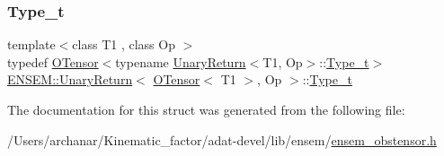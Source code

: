 \subsubsection{\texorpdfstring{Type\_t}{Type\_t}\hspace{0.1cm}{\footnotesize\ttfamily [3/3]}}
{\footnotesize\ttfamily template$<$class T1 , class Op $>$ \\
typedef \mbox{\hyperlink{classENSEM_1_1OTensor}{O\+Tensor}}$<$typename \mbox{\hyperlink{structENSEM_1_1UnaryReturn}{Unary\+Return}}$<$T1, Op$>$\+::\mbox{\hyperlink{structENSEM_1_1UnaryReturn_3_01OTensor_3_01T1_01_4_00_01Op_01_4_a2896ac85d983d41194d2482e3b851bb0}{Type\+\_\+t}}$>$ \mbox{\hyperlink{structENSEM_1_1UnaryReturn}{E\+N\+S\+E\+M\+::\+Unary\+Return}}$<$ \mbox{\hyperlink{classENSEM_1_1OTensor}{O\+Tensor}}$<$ T1 $>$, Op $>$\+::\mbox{\hyperlink{structENSEM_1_1UnaryReturn_3_01OTensor_3_01T1_01_4_00_01Op_01_4_a2896ac85d983d41194d2482e3b851bb0}{Type\+\_\+t}}}



The documentation for this struct was generated from the following file\+:\begin{DoxyCompactItemize}
\item 
/\+Users/archanar/\+Kinematic\+\_\+factor/adat-\/devel/lib/ensem/\mbox{\hyperlink{adat-devel_2lib_2ensem_2ensem__obstensor_8h}{ensem\+\_\+obstensor.\+h}}\end{DoxyCompactItemize}
